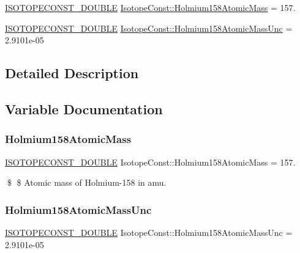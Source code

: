 \begin{DoxyCompactItemize}
\item 
\mbox{\hyperlink{group___isotope_const-_macros_ga8f45a7272ce02c0b4c65c44636ed719a}{I\+S\+O\+T\+O\+P\+E\+C\+O\+N\+S\+T\+\_\+\+D\+O\+U\+B\+LE}} \mbox{\hyperlink{group___isotope_const-_holmium-_ho158_ga7f4378a33df915451f49202f1504a8d0}{Isotope\+Const\+::\+Holmium158\+Atomic\+Mass}} = 157.
\item 
\mbox{\hyperlink{group___isotope_const-_macros_ga8f45a7272ce02c0b4c65c44636ed719a}{I\+S\+O\+T\+O\+P\+E\+C\+O\+N\+S\+T\+\_\+\+D\+O\+U\+B\+LE}} \mbox{\hyperlink{group___isotope_const-_holmium-_ho158_gac400d7b38ea893d084b09ad89423ee00}{Isotope\+Const\+::\+Holmium158\+Atomic\+Mass\+Unc}} = 2.\+9101e-\/05
\end{DoxyCompactItemize}


\subsection{Detailed Description}


\subsection{Variable Documentation}
\mbox{\label{group___isotope_const-_holmium-_ho158_ga7f4378a33df915451f49202f1504a8d0}} 
\subsubsection{\texorpdfstring{Holmium158\+Atomic\+Mass}{Holmium158AtomicMass}}
{\footnotesize\ttfamily \mbox{\hyperlink{group___isotope_const-_macros_ga8f45a7272ce02c0b4c65c44636ed719a}{I\+S\+O\+T\+O\+P\+E\+C\+O\+N\+S\+T\+\_\+\+D\+O\+U\+B\+LE}} Isotope\+Const\+::\+Holmium158\+Atomic\+Mass = 157.}

\$ \$ Atomic mass of Holmium-\/158 in amu. \mbox{\label{group___isotope_const-_holmium-_ho158_gac400d7b38ea893d084b09ad89423ee00}} 
\subsubsection{\texorpdfstring{Holmium158\+Atomic\+Mass\+Unc}{Holmium158AtomicMassUnc}}
{\footnotesize\ttfamily \mbox{\hyperlink{group___isotope_const-_macros_ga8f45a7272ce02c0b4c65c44636ed719a}{I\+S\+O\+T\+O\+P\+E\+C\+O\+N\+S\+T\+\_\+\+D\+O\+U\+B\+LE}} Isotope\+Const\+::\+Holmium158\+Atomic\+Mass\+Unc = 2.\+9101e-\/05}

